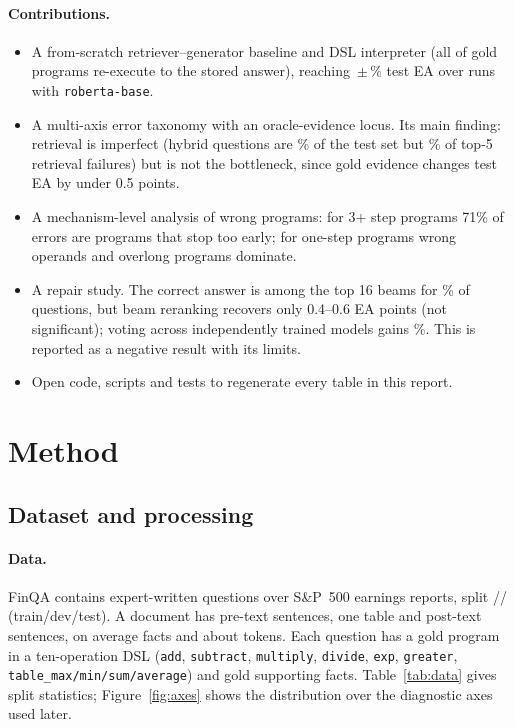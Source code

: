 \documentclass{article}
\newcommand{\code}[1]{\texttt{#1}}
\begin{document}
\paragraph{Contributions.}
\begin{itemize}
  \item A from-scratch retriever--generator baseline and DSL interpreter (all \DslOk{} of \DslTotal{} gold programs re-execute to the stored answer), reaching \SingleEAMean\,$\pm$\,\SingleEASd\% test EA over \NRuns{} runs with \code{roberta-base}.
  \item A multi-axis error taxonomy with an oracle-evidence locus. Its main finding: retrieval is imperfect (hybrid questions are \QShareHybrid\% of the test set but \FailShareHybrid\% of top-5 retrieval failures) but is not the bottleneck, since gold evidence changes test EA by under 0.5 points.
  \item A mechanism-level analysis of wrong programs: for 3+ step programs 71\% of errors are programs that stop too early; for one-step programs wrong operands and overlong programs dominate.
  \item A repair study. The correct answer is among the top 16 beams for \OracleKSixteen\% of questions, but beam reranking recovers only 0.4--0.6 EA points (not significant); voting across independently trained models gains \VoteThree\%. This is reported as a negative result with its limits.
  \item Open code, scripts and tests to regenerate every table in this report.
\end{itemize}

\section{Method}
\subsection{Dataset and processing}

\paragraph{Data.} FinQA contains \NTotal{} expert-written questions over S\&P~500 earnings reports, split \NTrain/\NDev/\NTest{} (train/dev/test). A document has pre-text sentences, one table and post-text sentences, on average \FactsPerDoc{} facts and about \TokensPerDoc{} tokens. Each question has a gold program in a ten-operation DSL (\code{add}, \code{subtract}, \code{multiply}, \code{divide}, \code{exp}, \code{greater}, \code{table\_max/min/sum/average}) and gold supporting facts. Table~\ref{tab:data} gives split statistics; Figure~\ref{fig:axes} shows the distribution over the diagnostic axes used later.
\end{document}
